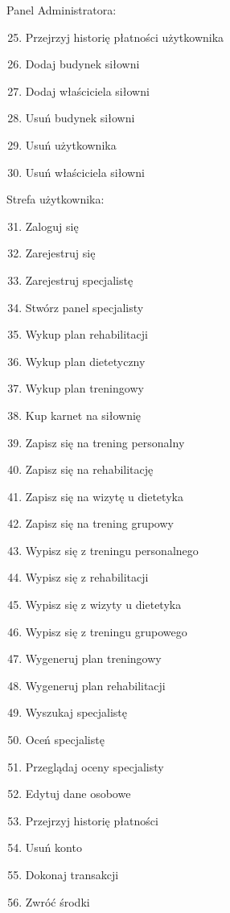 \documentclass[
]{article}
\providecommand{\tightlist}{%
  \setlength{\itemsep}{0pt}\setlength{\parskip}{0pt}}
\begin{document}
{Panel Administratora:}

\begin{enumerate}
\setcounter{enumi}{24}
\tightlist
\item
  {Przejrzyj historię płatności użytkownika}
\item
  {Dodaj budynek siłowni}
\item
  {Dodaj właściciela siłowni}
\item
  {Usuń budynek siłowni}
\item
  {Usuń użytkownika}
\item
  {Usuń właściciela siłowni}
\end{enumerate}

{Strefa użytkownika:}

\begin{enumerate}
\setcounter{enumi}{30}
\tightlist
\item
  {Zaloguj się}
\item
  {Zarejestruj się}
\item
  {Zarejestruj specjalistę}
\item
  {Stwórz panel specjalisty}
\item
  {Wykup plan rehabilitacji}
\item
  {Wykup plan dietetyczny}
\item
  {Wykup plan treningowy}
\item
  {Kup karnet na siłownię}
\item
  {Zapisz się na trening personalny}
\item
  {Zapisz się na rehabilitację}
\item
  {Zapisz się na wizytę u dietetyka}
\item
  {Zapisz się na trening grupowy}
\item
  {Wypisz się z treningu personalnego}
\item
  {Wypisz się z rehabilitacji}
\item
  {Wypisz się z wizyty u dietetyka}
\item
  {Wypisz się z treningu grupowego}
\item
  {Wygeneruj plan treningowy}
\item
  {Wygeneruj plan rehabilitacji}
\item
  {Wyszukaj specjalistę}
\item
  {Oceń specjalistę}
\item
  {Przeglądaj oceny specjalisty}
\item
  {Edytuj dane osobowe}
\item
  {Przejrzyj historię płatności}
\item
  {Usuń konto}
\item
  {Dokonaj transakcji}
\item
  {Zwróć środki}
\end{enumerate}

{}
\end{document}

